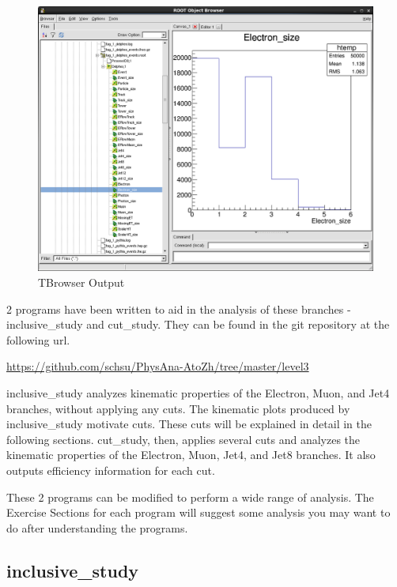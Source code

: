 \documentclass{article}
\begin{document}
\begin{figure}[!htbp]
	\centering
	\includegraphics[width = \linewidth]{tbrowser_screenshot.png}
	\caption{TBrowser Output}
	\label{fig:tbrowserOutput}
\end{figure}

2 programs have been written to aid in the analysis of these branches - inclusive\_study
and cut\_study. They can be found in the git repository at the following url.

\bigskip

\url{https://github.com/schsu/PhysAna-AtoZh/tree/master/level3}

\bigskip

inclusive\_study analyzes kinematic properties of the Electron, Muon, and Jet4 branches, without
applying any cuts. The kinematic plots produced by inclusive\_study motivate cuts. These cuts will
be explained in detail in the following sections. cut\_study, then, applies several cuts and analyzes
the kinematic properties of the Electron, Muon, Jet4, and Jet8 branches. It also outputs efficiency
information for each cut.

\bigskip

These 2 programs can be modified to perform a wide range of analysis. The Exercise Sections for
each program will suggest some analysis you may want to do after understanding the programs.

\subsection{inclusive\_study}
\end{document}
